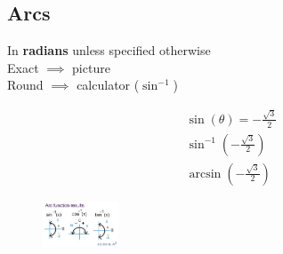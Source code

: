 \documentclass[twocolumn]{article}
\newcommand{\bd}{\textbf}
\begin{document}
	\subsection*{Arcs}
	In \bd{radians} unless specified otherwise \\
	Exact $\implies$ picture \\
	Round $\implies$ calculator ($\sin^{-1}$)
	
	\begin{align*}
		\sin(\theta) = -\frac{\sqrt{3}}{2} \\
		\sin^{-1}(-\frac{\sqrt{3}}{2}) \\
		 \arcsin(-\frac{\sqrt{3}}{2})
	\end{align*}

	\begin{figure}[H]
		\centering
		\includegraphics[width=0.20\textwidth]{ArcTrig.jpg}
	\end{figure}
\end{document}
